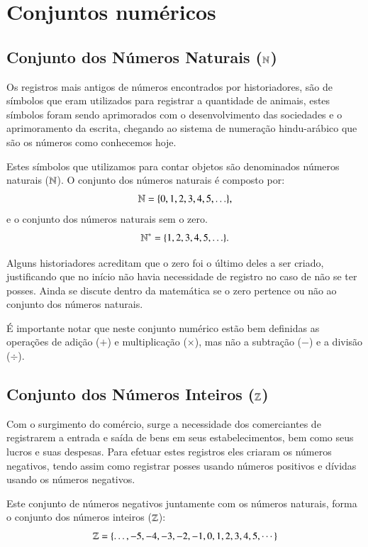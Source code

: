 \chapter{Conjuntos numéricos}
\section{Conjunto dos Números Naturais (\texorpdfstring{$\mathbb{N}$}{N})}

Os registros mais antigos de números encontrados por historiadores, são de símbolos que eram utilizados para registrar a quantidade de animais, estes símbolos foram sendo aprimorados com o desenvolvimento das sociedades e o aprimoramento da escrita, chegando ao sistema de numeração hindu-arábico que são os números como conhecemos hoje.

Estes símbolos que utilizamos para contar objetos são denominados números naturais ($\mathbb{N}$). O conjunto dos números naturais é composto por:
\[\mathbb{N}= \{0, 1, 2, 3, 4, 5, \ldots \},\]
e o conjunto dos números naturais sem o zero.
\[\mathbb{N}^{*}= \{1, 2, 3, 4, 5, \ldots \}.\]

Alguns historiadores acreditam que o zero foi o último deles a ser criado, justificando que no início não havia necessidade de registro no caso de não se ter posses. Ainda se discute dentro da matemática se o zero pertence ou não ao conjunto dos números naturais.

É importante notar que neste conjunto numérico estão bem definidas as operações de adição ($+$) e multiplicação ($\times$), mas não a subtração ($-$) e a divisão ($\div$).

\section{Conjunto dos Números Inteiros (\texorpdfstring{$\mathbb{Z}$}{Z})}

Com o surgimento do comércio, surge a necessidade dos comerciantes de registrarem a entrada e saída de bens em seus estabelecimentos, bem como seus lucros e suas despesas. Para efetuar estes registros eles criaram os números negativos, tendo assim como registrar posses usando números positivos e dívidas usando os números negativos.

Este conjunto de números negativos juntamente com os números naturais, forma o conjunto dos números inteiros ($\mathbb{Z}$):
\[\mathbb{Z}= \{ \ldots , -5, -4, -3, -2, -1, 0, 1, 2, 3, 4, 5, \cdots \}\]

